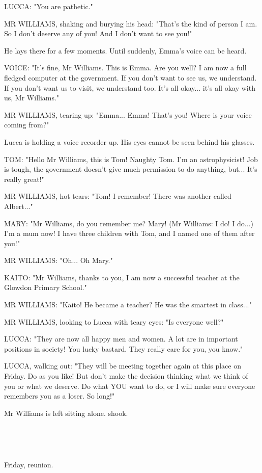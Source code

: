 \documentclass[11pt]{article}
\begin{document}
LUCCA: "You are pathetic."

MR WILLIAMS, shaking and burying his head: "That's the kind of person I am.
So I don't deserve any of you!
And I don't want to see you!"

He lays there for a few moments. 
Until suddenly, Emma's voice can be heard. 

VOICE: "It's fine, Mr Williams. 
This is Emma.
Are you well? 
I am now a full fledged computer at the government.
If you don't want to see us, we understand. 
If you don't want us to visit, we understand too.
It's all okay... it's all okay with us, Mr Williams."

MR WILLIAMS, tearing up: "Emma... Emma! That's you! Where is your voice coming from?"

Lucca is holding a voice recorder up.
His eyes cannot be seen behind his glasses.

TOM: "Hello Mr Williams, this is Tom! 
Naughty Tom.
I'm an astrophysicist! 
Job is tough, the government doesn't give much permission to do anything, but... It's really great!"

MR WILLIAMS, hot tears: "Tom! I remember! There was another called Albert..."

MARY: "Mr Williams, do you remember me? Mary! (Mr Williams: I do! I do...) 
I'm a mum now! I have three children with Tom, and I named one of them after you!"

MR WILLIAMS: "Oh... Oh Mary."

KAITO: "Mr Williams, thanks to you, I am now a successful teacher at the Glowdon Primary School."

MR WILLIAMS: "Kaito! He became a teacher? 
He was the smartest in class..."

MR WILLIAMS, looking to Lucca with teary eyes: "Is everyone well?"

LUCCA: "They are now all happy men and women. A lot are in important positions in society!
You lucky bastard. They really care for you, you know."

LUCCA, walking out: "They will be meeting together again at this place on Friday.
Do as you like!
But don't make the decision thinking what we think of you or what we deserve.
Do what YOU want to do, or I will make sure everyone remembers you as a loser.
So long!"

Mr Williams is left sitting alone. shook.

\ 

\ 

Friday, reunion.
\end{document}

